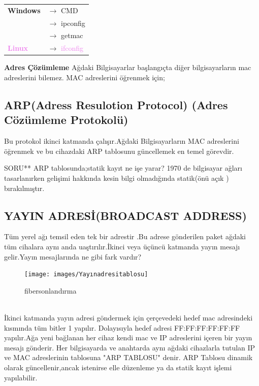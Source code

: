 \begin{table}[h]
    \centering
    \begin{tabular}{ll}
        \textbf{Windows}                    & $\rightarrow$  CMD                           \\
        & $\rightarrow$  ipconfig                      \\
        & $\rightarrow$  getmac                        \\
        \textbf{ \textcolor{violet}{Linux}} & $\rightarrow$ \textcolor{violet}{ifconfig} \\
    \end{tabular}
\end{table}

\textbf{Adres Çözümleme} Ağdaki Bilgisayarlar başlangıçta diğer bilgisayarların mac adreslerini bilemez.
MAC adreslerini öğrenmek için;
\subsection*{ARP(Adress Resulotion Protocol) (Adres Cözümleme Protokolü)}
Bu protokol ikinci katmanda çalışır.Ağdaki Bilgisayarların MAC adreslerini öğrenmek ve bu cihazdaki ARP tablosunu güncellemek en temel görevdir.

SORU**
ARP tablosunda;statik kayıt ne işe yarar?
1970 de bilgisayar ağları tasarlanırken gelişimi hakkında kesin bilgi olmadığında statik(önü açık ) bırakılmıştır.
\subsection*{YAYIN ADRESİ(BROADCAST ADDRESS)}
Tüm yerel ağı temsil eden tek bir adrestir .Bu adrese gönderilen paket ağdaki tüm cihalara aynı anda uaştırılır.İkinci veya üçüncü katmanda yayın mesajı gelir.Yayın mesajlarında ne gibi fark vardır?
\begin{figure}[!ht]
    \texttt{[image: images/Yayınadresitablosu]}
    \caption{fibersonlandırma}
    \label{fig:fosonlandırma}
\end{figure}
\\
İkinci katmanda yayın adresi göndermek için çerçevedeki hedef mac adresindeki kısmında tüm bitler 1 yapılır.
Dolayısıyla hedef adresi FF:FF:FF:FF:FF:FF yapılır.Ağa yeni bağlanan her cihaz kendi mac ve IP adreslerini içeren bir yayın mesajı gönderir.
Her bilgisayarda ve anahtarda aynı ağdaki cihazlarla tutulan IP ve MAC adreslerinin tablosuna "ARP TABLOSU" denir. ARP Tablosu dinamik olarak güncellenir,ancak istenirse elle düzenleme ya da statik kayıt işlemi yapılabilir.
